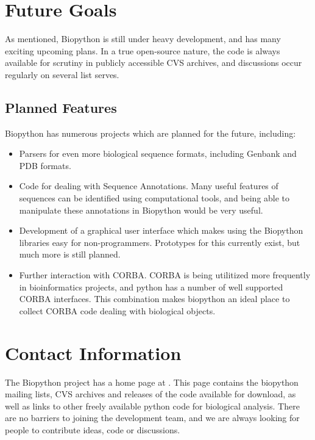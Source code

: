 \documentclass[dvips]{article}
\begin{document}
\section{Future Goals}


As mentioned, Biopython is still under heavy development, and has many exciting upcoming plans. In a true open-source nature, the code is always available for scrutiny in publicly accessible CVS archives, and discussions occur regularly on several list serves. 


\subsection{Planned Features}


Biopython has numerous projects which are planned for the future, including:

\begin{itemize}

\item Parsers for even more biological sequence formats, including Genbank and PDB formats.

\item Code for dealing with Sequence Annotations. Many useful features of sequences can be identified using computational tools, and being able to manipulate these annotations in Biopython would be very useful.

\item Development of a graphical user interface which makes using the Biopython libraries easy for non-programmers.  Prototypes for this currently exist, but much more is still planned.

\item Further interaction with CORBA. CORBA is being utilitized more frequently in bioinformatics projects, and python has a number of well supported CORBA interfaces. This combination makes biopython an ideal place to collect CORBA code dealing with biological objects.

\end{itemize}

\section{Contact Information}


The Biopython project has a home page at . This page contains the biopython mailing lists, CVS archives and releases of the code available for download, as well as links to other freely available python code for biological analysis. There are no barriers to joining the development team, and we are always looking for people to contribute ideas, code or discussions.
\end{document}

